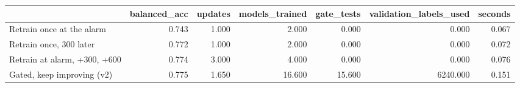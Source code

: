 \begin{tabular}{lrrrrrr}
\toprule
 & balanced_acc & updates & models_trained & gate_tests & validation_labels_used & seconds \\
\midrule
Retrain once at the alarm & 0.743 & 1.000 & 2.000 & 0.000 & 0.000 & 0.067 \\
Retrain once, 300 later & 0.772 & 1.000 & 2.000 & 0.000 & 0.000 & 0.072 \\
Retrain at alarm, +300, +600 & 0.774 & 3.000 & 4.000 & 0.000 & 0.000 & 0.076 \\
Gated, keep improving (v2) & 0.775 & 1.650 & 16.600 & 15.600 & 6240.000 & 0.151 \\
\bottomrule
\end{tabular}
